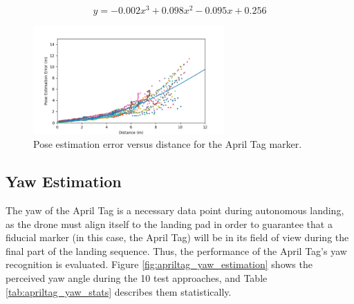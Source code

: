 \begin{equation}
    y = -0.002x^3+0.098x^2-0.095x+0.256
    \label{equation:april_tag_regression}
\end{equation}

\begin{figure}[h!]
    \centering
    \includegraphics[width=0.65\textwidth]{images/apriltag_pose_estimation_error.png}
    \caption{Pose estimation error versus distance for the April Tag marker.}
    \label{fig:apriltag_pose_estimation_error}
\end{figure}



\subsection{Yaw Estimation}

The yaw of the April Tag is a necessary data point during autonomous landing, as the drone must align itself to the landing pad in order to guarantee that a fiducial marker (in this case, the April Tag) will be in its field of view during the final part of the landing sequence. Thus, the performance of the April Tag's yaw recognition is evaluated. Figure \ref{fig:apriltag_yaw_estimation} shows the perceived yaw angle during the 10 test approaches, and Table \ref{tab:apriltag_yaw_stats} describes them statistically. 


